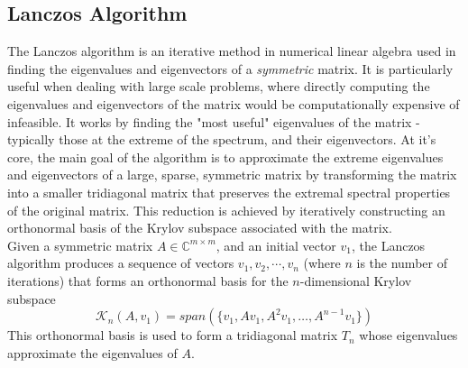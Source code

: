 \subsection{Lanczos Algorithm}
The Lanczos algorithm is an iterative method in numerical linear algebra used in finding the eigenvalues and eigenvectors of a \textit{symmetric} matrix. It is particularly useful when dealing with large scale problems, where directly computing the eigenvalues and eigenvectors of the matrix would be computationally expensive of infeasible. It works by finding the "most useful" eigenvalues of the matrix - typically those at the extreme of the spectrum, and their eigenvectors. At it's core, the main goal of the algorithm is to approximate the extreme eigenvalues and eigenvectors of a large, sparse, symmetric matrix by transforming the matrix into a smaller tridiagonal matrix that preserves the extremal spectral properties of the original matrix. This reduction is achieved by iteratively constructing an orthonormal basis of the Krylov subspace associated with the matrix.\\
Given a symmetric matrix $A \in \mathbb{C}^{m\times m}$, and an initial vector $v_1$, the Lanczos algorithm produces a sequence of vectors $v_1, v_2, \cdots, v_n$ (where $n$ is the number of iterations) that forms an orthonormal basis for the $n$-dimensional Krylov subspace
\begin{equation}
	\mathcal{K}_n(A, v_1) = span(\{v_1, Av_1, A^2v_1, \ldots, A^{n-1}v_1\})
\end{equation}
This orthonormal basis is used to form a tridiagonal matrix $T_n$ whose eigenvalues approximate the eigenvalues of $A$.
